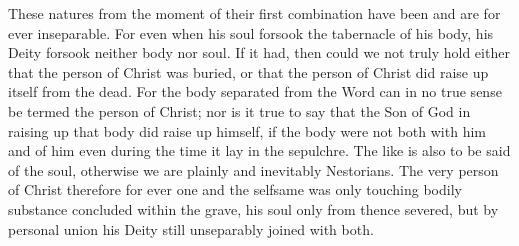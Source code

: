 These natures from the moment of their first combination have been and are for ever inseparable. For even when his soul forsook the tabernacle of his body, his Deity forsook neither body nor soul. If it had, then could we not truly hold either that the person of Christ was buried, or that the person of Christ did raise up itself from the dead. For the body separated from the Word can in no true sense be termed the person of Christ; nor is it true to say that the Son of God in raising up that body did raise up himself, if the body were not both with him and of him even during the time it lay in the sepulchre. The like is also to be said of the soul, otherwise we are plainly and inevitably Nestorians. The very person of Christ therefore for ever one and the selfsame was only touching bodily substance concluded within the grave, his soul only from thence severed, but by personal union his Deity still unseparably joined with both.

